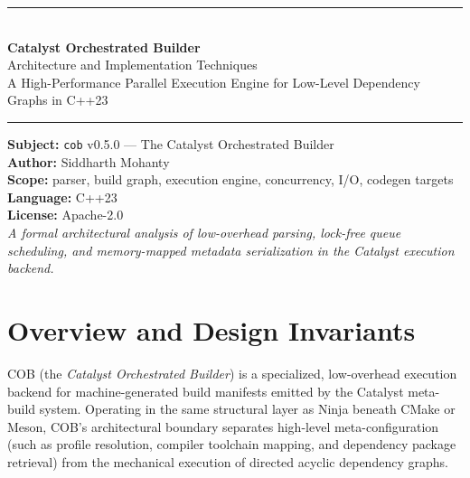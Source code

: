\documentclass[11pt]{article}
\begin{document}
\begin{titlepage}
\vspace*{2.2cm}
\begin{flushleft}
{\color{accent}\rule{\linewidth}{2pt}}\\[10pt]
{\Huge\bfseries\color{accentdark} Catalyst Orchestrated Builder}\\[8pt]
{\LARGE\color{ink} Architecture and Implementation Techniques}\\[14pt]
{\large\color{slate} A High-Performance Parallel Execution Engine for Low-Level Dependency Graphs in C++23}\\[6pt]
{\color{accent}\rule{\linewidth}{1pt}}
\end{flushleft}

\vfill
\begin{flushleft}
\large
\textbf{Subject:} \texttt{cob} v0.5.0 --- The Catalyst Orchestrated Builder \\[4pt]
\textbf{Author:} Siddharth Mohanty\\
\textbf{Scope:} parser, build graph, execution engine, concurrency, I/O, codegen targets\\[4pt]
\textbf{Language:} C++23 \\[4pt]
\textbf{License:} Apache-2.0\\[14pt]
\textit{\color{slate} A formal architectural analysis of low-overhead parsing, lock-free queue scheduling, and memory-mapped metadata serialization in the Catalyst execution backend.}
\end{flushleft}
\vspace{1cm}
\end{titlepage}

\tableofcontents
\thispagestyle{empty}
\clearpage

\section{Overview and Design Invariants}

COB (the \emph{Catalyst Orchestrated Builder}) is a specialized, low-overhead execution
backend for machine-generated build manifests emitted by the Catalyst meta-build
system. Operating in the same structural layer as Ninja beneath CMake or Meson,
COB's architectural boundary separates high-level meta-configuration
(such as profile resolution, compiler toolchain mapping, and dependency
package retrieval) from the mechanical execution of directed acyclic dependency
graphs.
\end{document}

